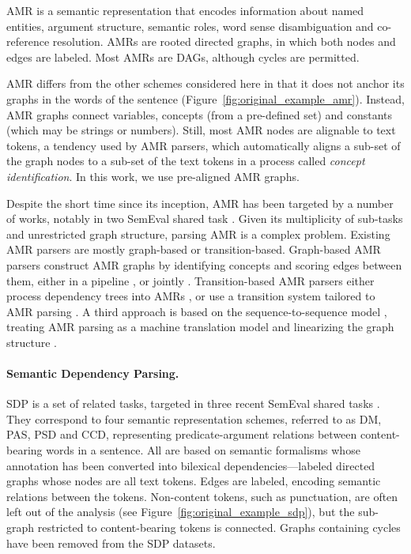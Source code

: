 \documentclass[11pt,a4paper]{article}
\begin{document}
AMR \cite{banarescu2013abstract} is a semantic representation that encodes information about named entities, 
argument structure, semantic roles, word sense disambiguation and co-reference resolution.
AMRs are rooted directed graphs, in which both nodes and edges are labeled.
Most AMRs are DAGs, although cycles are permitted.

AMR differs from the other schemes considered here in that it does not anchor its graphs
in the words of the sentence (Figure~\ref{fig:original_example_amr}). Instead, AMR graphs
connect variables, concepts (from a pre-defined set) and constants (which may be strings or numbers).
Still, most AMR nodes are alignable to text tokens, a tendency used by AMR parsers,
which automatically aligns a sub-set of the graph nodes to a sub-set of the text tokens in a process
called \textit{concept identification}. In this work, we use pre-aligned AMR graphs.

Despite the short time since its inception, AMR has been targeted by a number of works,
notably in two SemEval shared task \cite{may2016semeval,may2017semeval}.
Given its multiplicity of sub-tasks and unrestricted graph structure, parsing AMR is a complex problem.
Existing AMR parsers are mostly graph-based or transition-based.
Graph-based AMR parsers construct AMR graphs
by identifying concepts and scoring edges between them, either in a pipeline
\cite{flanigan2014discriminative,artzi2015broad,pust2015parsing,foland2017abstract},
or jointly \cite{zhou2016amr}.
Transition-based AMR parsers either process dependency trees into AMRs
\cite{wang-xue-pradhan:2015:ACL-IJCNLP,wang2015transition,wang-EtAl:2016:SemEval,goodman2016noise},
or use a transition system tailored to AMR parsing \citet{damonte-17,D17-1130}.
A third approach is based on the sequence-to-sequence model \cite{sutskever2014sequence},
treating AMR parsing as a machine translation model and linearizing the graph structure
\cite{barzdins2016riga,Gildea2017AddressingTD,Konstas2017NeuralAS,Buys2017RobustIN}.


\paragraph{Semantic Dependency Parsing.}\label{sec:sdp}

SDP is a set of related tasks, targeted in three recent SemEval shared tasks 
\cite{oepen2014semeval,oepen2015semeval,oepen2016towards}.
They correspond to four semantic representation schemes, referred to as
DM, PAS, PSD and CCD, representing
predicate-argument relations between content-bearing words in a sentence.
All are based on semantic formalisms whose annotation has been
converted into bilexical dependencies---labeled
directed graphs whose nodes are all text tokens.
Edges are labeled, encoding semantic relations between the tokens.
Non-content tokens, such as punctuation,
are often left out of the analysis (see Figure~\ref{fig:original_example_sdp}),
but the sub-graph restricted to content-bearing tokens is connected.
Graphs containing cycles have been removed from the SDP datasets.
\end{document}
